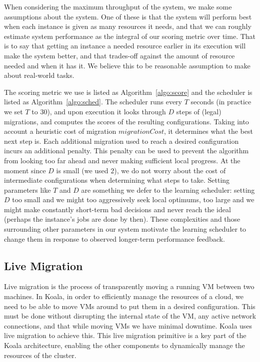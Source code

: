 When considering the maximum throughput of the system, we make some assumptions
about the system.  One of these is that the system will perform best when each
instance is given as many resources it needs, and that we can roughly estimate
system performance as the integral of our scoring metric over time.  That is to
say that getting an instance a needed resource earlier in its execution will
make the system better, and that trades-off against the amount of resource
needed and when it has it.  We believe this to be reasonable assumption to make
about real-world tasks.



The scoring metric we use is listed as Algorithm~\ref{algo:score} and the scheduler is
listed as Algorithm~\ref{algo:sched}.  The scheduler runs every $T$ seconds (in
practice we set $T$ to 30), and upon execution it looks through $D$ steps of
(legal) migrations, and computes the scores of the resulting configurations.
Taking into account a heuristic cost of migration $migrationCost$, it determines
what the best next step is.  Each additional migration used to reach a desired
configuration incurs an additional penalty.   This penalty can be used to
prevent the algorithm from looking too far ahead and never making sufficient
local progress.  At the moment since $D$ is small (we used $2$), we do not worry
about the cost of intermediate configurations when determining what steps to
take.  Setting parameters like $T$ and $D$ are something we defer to the
learning scheduler: setting $D$ too small and we might too aggressively seek
local optimums, too large and we might make constantly short-term bad decisions
and never reach the ideal (perhaps the instance's jobs are done by then).  These
complexities and those surrounding other parameters in our system motivate the
learning scheduler to change them in response to observed longer-term
performance feedback.

\subsection{Live Migration}
Live migration is the process of transparently moving a running VM between two
machines.  In Koala, in order to efficiently manage the resources of a cloud,
we need to be able to move VMs around to put them in a desired configuration.
This must be done without disrupting the internal state of the VM, any active
network connections, and that while moving VMs we have minimal downtime.  Koala
uses live migration to achieve this.  This live migration primitive is a key
part of the Koala architecture, enabling the other components to dynamically
manage the resources of the cluster.

